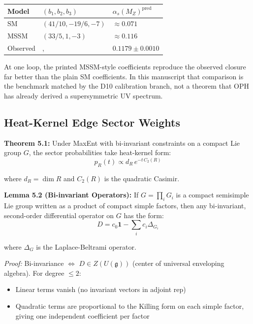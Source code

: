 {\def\LTcaptype{none} %
\begin{longtable}[]{@{}>{\RaggedRight\arraybackslash}p{}>{\RaggedRight\arraybackslash}p{}>{\RaggedRight\arraybackslash}p{}@{}}
\toprule\noalign{}
Model & \((b_1, b_2, b_3)\) & \(\alpha_s(M_Z)^{\text{pred}}\) \\
\midrule\noalign{}
\endhead
\bottomrule\noalign{}
\endlastfoot
SM & \((41/10, -19/6, -7)\) & \(\approx 0.071\) \\
MSSM & \((33/5, 1, -3)\) & \(\approx 0.116\) \\
Observed &, & \(0.1179 \pm 0.0010\) \\
\end{longtable}
}

At one loop, the printed MSSM-style coefficients reproduce the observed closure far better than the plain SM coefficients. In this manuscript that comparison is the benchmark matched by the D10 calibration branch, not a theorem that OPH has already derived a supersymmetric UV spectrum.

\subsection{Heat-Kernel Edge Sector Weights}\label{53-heat-kernel-edge-sector-weights}

\textbf{Theorem 5.1:} Under MaxEnt with bi-invariant constraints on a compact Lie group \(G\), the sector probabilities take heat-kernel form: \[p_R(t) \propto d_R \, e^{-t \, C_2(R)}\]

where \(d_R = \dim R\) and \(C_2(R)\) is the quadratic Casimir.

\textbf{Lemma 5.2 (Bi-invariant Operators):} If \(G=\prod_i G_i\) is a compact semisimple Lie group written as a product of compact simple factors, then any bi-invariant, second-order differential operator on \(G\) has the form: \[D = c_0 \mathbf{1} - \sum_i c_i \Delta_{G_i}\]

where \(\Delta_G\) is the Laplace-Beltrami operator.

\emph{Proof:} Bi-invariance \(\Leftrightarrow\) \(D \in Z(U(\mathfrak{g}))\) (center of universal enveloping algebra). For degree \(\leq 2\):

\begin{itemize}
\tightlist
\item
 Linear terms vanish (no invariant vectors in adjoint rep)
\item
 Quadratic terms are proportional to the Killing form on each simple factor, giving one independent coefficient per factor
\end{itemize}

